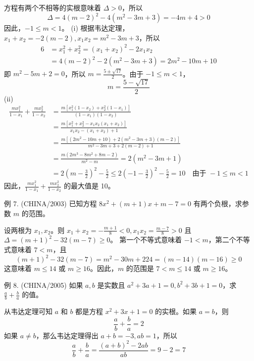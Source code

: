 \begin{questions}
\begin{solution}
方程有两个不相等的实根意味着 $\Delta > 0$，所以
\[
\Delta = 4(m - 2)^2 - 4(m^2 - 3m + 3) = -4m + 4 > 0
\]
因此，$-1 \le m < 1$。
(i) 根据韦达定理，$x_1 + x_2 = -2(m - 2), x_1x_2 = m^2 - 3m + 3$，所以
\begin{align*}
6 &= x_1^2 + x_2^2 = (x_1 + x_2)^2 - 2x_1x_2 \\
&= 4(m - 2)^2 - 2(m^2 - 3m + 3) = 2m^2 - 10m + 10
\end{align*}
即 $m^2 - 5m + 2 = 0$，所以 $m = \frac{5 \pm \sqrt{17}}{2}$。由于 $-1 \le m < 1$，
\[
m = \frac{5 - \sqrt{17}}{2}
\]
(ii) \begin{align*}
\frac{mx_1^2}{1 - x_1} + \frac{mx_2^2}{1 - x_2} &= \frac{m[x_1^2(1 - x_2) + x_2^2(1 - x_1)]}{(1 - x_1)(1 - x_2)} \\
&= \frac{m[x_1^2 + x_2^2 - x_1x_2(x_1 + x_2)]}{x_1x_2 - (x_1 + x_2) + 1} \\
&= \frac{m[(2m^2 - 10m + 10) + 2(m^2 - 3m + 3)(m - 2)]}{m^2 - 3m + 3 + 2(m - 2) + 1} \\
&= \frac{m(2m^3 - 8m^2 + 8m - 2)}{m^2 - m} = 2(m^2 - 3m + 1) \\
&= 2\left(m - \frac{3}{2}\right)^2 - \frac{5}{2} \le 2\left(-1 - \frac{3}{2}\right)^2 - \frac{5}{2} = 10 \quad \text{由于 } -1 \le m < 1
\end{align*}
因此，$\frac{mx_1^2}{1 - x_1} + \frac{mx_2^2}{1 - x_2}$ 的最大值是 10。
\end{solution}

\question 例 7. (CHINA/2003) 已知方程 $8x^2 + (m + 1)x + m - 7 = 0$ 有两个负根，求参数 $m$ 的范围。

\begin{solution}
设两根为 $x_1, x_2$。则 $x_1 + x_2 = -\frac{m + 1}{8} < 0, x_1x_2 = \frac{m - 7}{8} > 0$ 且 $\Delta = (m + 1)^2 - 32(m - 7) \ge 0$。
第一个不等式意味着 $-1 < m$，第二个不等式意味着 $7 < m$，且
\[
(m + 1)^2 - 32(m - 7) = m^2 - 30m + 224 = (m - 14)(m - 16) \ge 0
\]
这意味着 $m \le 14$ 或 $m \ge 16$。因此，$m$ 的范围是 $7 < m \le 14$ 或 $m \ge 16$。
\end{solution}

\question 例 8. (CHINA/2005) 如果 $a, b$ 是实数且 $a^2 + 3a + 1 = 0, b^2 + 3b + 1 = 0$，求 $\frac{a}{b} + \frac{b}{a}$ 的值。

\begin{solution}
从韦达定理可知 $a$ 和 $b$ 都是方程 $x^2 + 3x + 1 = 0$ 的实根。如果 $a = b$，则
\[
\frac{a}{b} + \frac{b}{a} = 2
\]
如果 $a \neq b$，那么韦达定理得出 $a + b = -3, ab = 1$，所以
\[
\frac{a}{b} + \frac{b}{a} = \frac{(a + b)^2 - 2ab}{ab} = 9 - 2 = 7
\]
\end{solution}


\end{questions}

